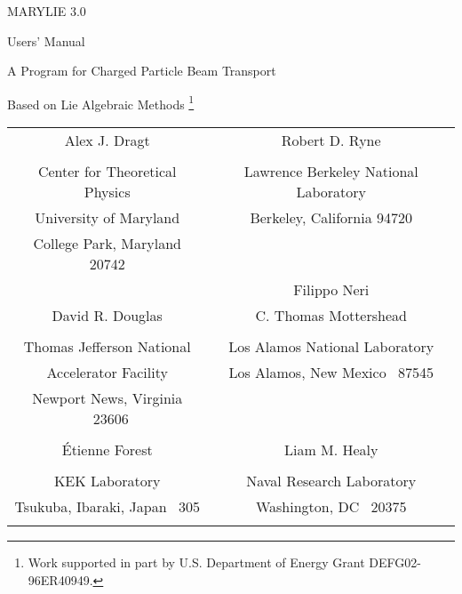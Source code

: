 
\begin{titlepage}
\begin{center}
{\Huge MARYLIE 3.0}

\vspace{.15in}
{\huge Users' Manual}

\vspace{10mm}
{\LARGE  A Program for Charged Particle Beam Transport}

\vspace{.15in}
{\LARGE  Based on Lie Algebraic Methods
\footnote{Work supported in part by U.S. Department of Energy
Grant DEFG02-96ER40949.}}

\vspace{20mm}


\begin{tabular}{cc}
\large Alex J. Dragt                  & \large Robert D. Ryne \\
\vspace{-2mm}\\
Center for Theoretical Physics        & Lawrence Berkeley National
Laboratory \\
University of Maryland                & Berkeley, California  94720 \\
College Park, Maryland  20742

\vspace{5mm}\\
                                      & \large Filippo Neri\\
\large David R. Douglas               & \large C. Thomas Mottershead \\
\vspace{-2mm}\\
Thomas Jefferson National             & Los Alamos National Laboratory \\
Accelerator Facility                  & Los Alamos, New Mexico \ 87545 \\
Newport News, Virginia \ 23606        \\

\vspace{5mm}\\
\large \'Etienne Forest               & \large Liam M. Healy\\
\vspace{-2mm}\\
KEK Laboratory                        & Naval Research Laboratory\\
Tsukuba, Ibaraki, Japan \ 305         & Washington, DC \ 20375\\
\vspace{5mm}\\


\end{tabular}
\end{center}
\end{titlepage}
